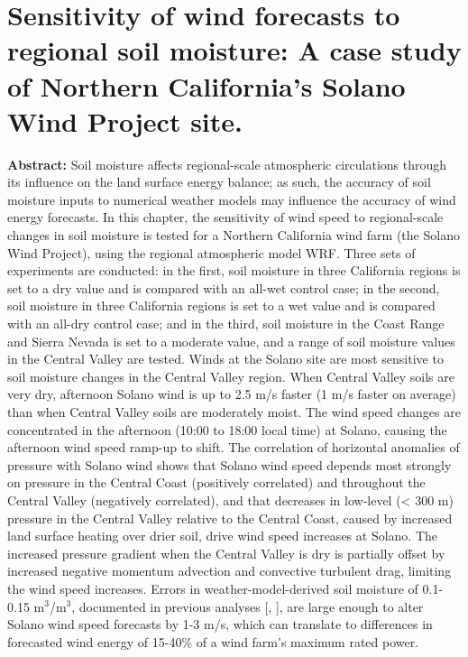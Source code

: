 \chapter{Sensitivity of wind forecasts to regional soil moisture: A case study of Northern California's Solano Wind Project site.}
\label{c.wind}

\textbf{Abstract:}  Soil moisture affects regional-scale atmospheric circulations through its influence on the land surface energy balance; as such, the accuracy of soil moisture inputs to numerical weather models may influence the accuracy of wind energy forecasts.  In this chapter, the sensitivity of wind speed to regional-scale changes in soil moisture is tested for a Northern California wind farm (the Solano Wind Project), using the regional atmospheric model WRF.  Three sets of experiments are conducted: in the first, soil moisture in three California regions is set to a dry value and is compared with an all-wet control case; in the second, soil moisture in three California regions is set to a wet value and is compared with an all-dry control case; and in the third, soil moisture in the Coast Range and Sierra Nevada is set to a moderate value, and a range of soil moisture values in the Central Valley are tested.  Winds at the Solano site are most sensitive to soil moisture changes in the Central Valley region.  When Central Valley soils are very dry, afternoon Solano wind is up to 2.5 m/s faster (1 m/s faster on average) than when Central Valley soils are moderately moist.  The wind speed changes are concentrated in the afternoon (10:00 to 18:00 local time) at Solano, causing the afternoon wind speed ramp-up to shift.  The correlation of horizontal anomalies of pressure with Solano wind shows that Solano wind speed depends most strongly on pressure in the Central Coast (positively correlated) and throughout the Central Valley (negatively correlated), and that decreases in low-level (< 300 m) pressure in the Central Valley relative to the Central Coast, caused by increased land surface heating over drier soil, drive wind speed increases at Solano.  The increased pressure gradient when the Central Valley is dry is partially offset by increased negative momentum advection and convective turbulent drag, limiting the wind speed increases.  Errors in weather-model-derived soil moisture of 0.1-0.15 m$^3$/m$^3$, documented in previous analyses [\cite{marshall2003impact}, \cite{godfrey2008soil}], are large enough to alter Solano wind speed forecasts by 1-3 m/s, which can translate to differences in forecasted wind energy of 15-40\% of a wind farm's maximum rated power.








